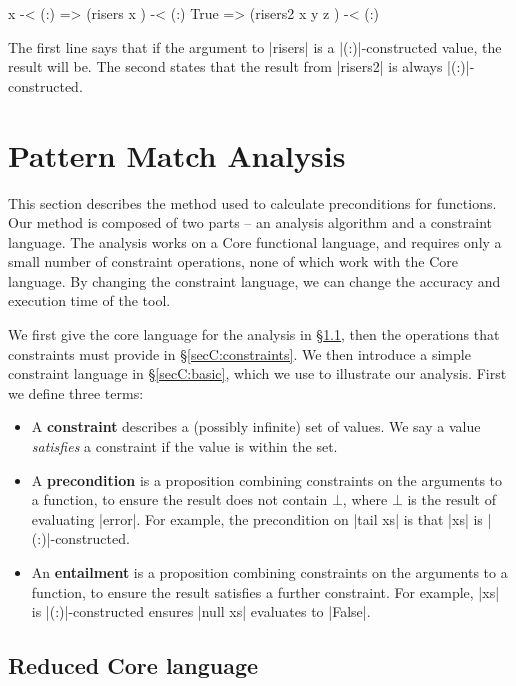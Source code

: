 \ignore\begin{code}
x -< (:)  => (risers x       ) -< (:)
True      => (risers2 x y z  ) -< (:)
\end{code}

\noindent The first line says that if the argument to |risers| is a |(:)|-constructed value, the result will be. The second states that the result from |risers2| is always |(:)|-constructed.


\section{Pattern Match Analysis}
\label{secC:manipulate}

This section describes the method used to calculate preconditions for functions. Our method is composed of two parts -- an analysis algorithm and a constraint language. The analysis works on a Core functional language, and requires only a small number of constraint operations, none of which work with the Core language. By changing the constraint language, we can change the accuracy and execution time of the tool.

We first give the core language for the analysis in \S\ref{secC:catch_core}, then the operations that constraints must provide in \S\ref{secC:constraints}. We then introduce a simple constraint language in \S\ref{secC:basic}, which we use to illustrate our analysis. First we define three terms:

\begin{itemize}
\item A \textbf{constraint} describes a (possibly infinite) set of values. We say a value \textit{satisfies} a constraint if the value is within the set.
\item A \textbf{precondition} is a proposition combining constraints on the arguments to a function, to ensure the result does not contain $\bot{}$, where $\bot{}$ is the result of evaluating |error|. For example, the precondition on |tail xs| is that |xs| is |(:)|-constructed.
\item An \textbf{entailment}  is a proposition combining constraints on the arguments to a function, to ensure the result satisfies a further constraint. For example, |xs| is |(:)|-constructed ensures |null xs| evaluates to |False|.
\end{itemize}

\subsection{Reduced Core language}
\label{secC:catch_core}

